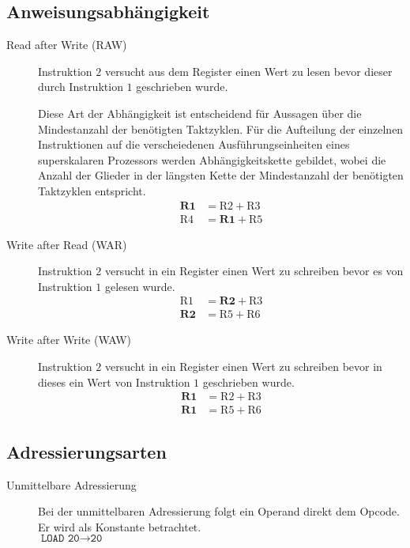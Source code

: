 \documentclass
[
	8pt,		%
	ngerman,	%
	a4paper,	%
	landscape,	%
	final		%
]{extarticle}
\begin{document}
\begin{multicols*}{4}
\subsection{Anweisungsabhängigkeit}
\begin{description}
	\item[Read after Write (RAW)]
	      Instruktion \(2\) versucht aus dem Register einen Wert zu lesen
	      bevor dieser durch Instruktion \(1\) geschrieben wurde. \par
	      Diese Art der Abhängigkeit ist entscheidend für Aussagen über die
	      Mindestanzahl der benötigten Taktzyklen. Für die Aufteilung der
	      einzelnen Instruktionen auf die verscheiedenen
	      Ausführungseinheiten eines superskalaren Prozessors werden
	      Abhängigkeitskette gebildet, wobei die Anzahl der Glieder in der
	      längsten Kette der Mindestanzahl der benötigten Taktzyklen
	      entspricht.
	      \begin{align}
		      \textbf{R1} & = \text{R2} + \text{R3}   \\
		      \text{R4}   & = \textbf{R1} + \text{R5}
	      \end{align}
	      \setcounter{equation}{0}

	\item[Write after Read (WAR)]
	      Instruktion \(2\) versucht in ein Register einen Wert zu schreiben
	      bevor es von Instruktion \(1\) gelesen wurde.
	      \begin{align}
		      \text{R1}   & = \textbf{R2} + \text{R3} \\
		      \textbf{R2} & = \text{R5} + \text{R6}
	      \end{align}
	      \setcounter{equation}{0}

	\item[Write after Write (WAW)]
	      Instruktion \(2\) versucht in ein Register einen Wert zu schreiben
	      bevor in dieses ein Wert von Instruktion \(1\) geschrieben wurde.
	      \begin{align}
		      \textbf{R1} & = \text{R2} + \text{R3} \\
		      \textbf{R1} & = \text{R5} + \text{R6}
	      \end{align}
	      \setcounter{equation}{0}
\end{description}
\subsection{Adressierungsarten}
\begin{description}
	\item[Unmittelbare Adressierung]
	      Bei der unmittelbaren Adressierung folgt ein Operand direkt dem
	      Opcode. Er wird als Konstante betrachtet. \\
	      $\texttt{LOAD 20}\rightarrow\texttt{20}$


\end{description}
\end{multicols*}
\end{document}
